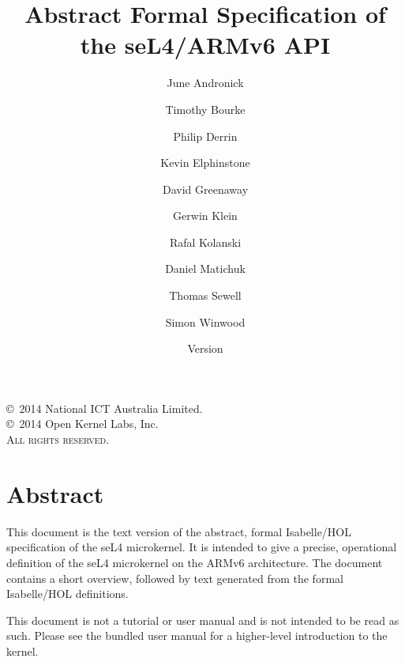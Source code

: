 \documentclass[10pt,a4paper]{scrbook}
\newcommand{\version}{}
\begin{document}
\title{Abstract Formal Specification of the seL4/ARMv6 API}

\date{Version \version}

\author{%
June Andronick \and
Timothy Bourke \and
Philip Derrin \and
Kevin Elphinstone \and
David Greenaway \and
Gerwin Klein \and
Rafal Kolanski \and
Daniel Matichuk \and
Thomas Sewell \and
Simon Winwood
}


\maketitle

\thispagestyle{empty}

\vfill

\copyright~2014 National ICT Australia Limited.\\
\copyright~2014 Open Kernel Labs, Inc.\\

\textsc{All rights reserved}. 

\clearpage

\chapter*{Abstract}
This document is the text version of the abstract, formal 
Isabelle/HOL specification of the seL4 microkernel. It is
intended to give a precise, operational definition of the
seL4 microkernel on the ARMv6 architecture.
The document contains a short overview, followed by 
text generated from the formal Isabelle/HOL definitions.

This document is not a tutorial or user manual and is not intended to be read
as such. Please see the bundled user manual for a higher-level introduction to
the kernel.


\cleardoublepage

\tableofcontents





\end{document}
